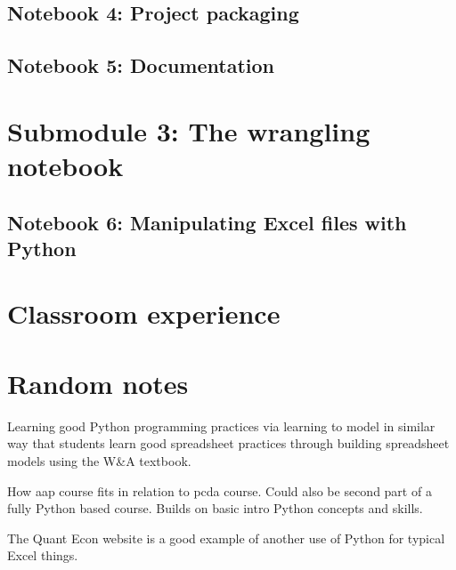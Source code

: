 \documentclass[ited,blindrev]{informs3}              %
\begin{document}
\subsection{Notebook 4: Project packaging}
\subsection{Notebook 5: Documentation}

\section{Submodule 3: The wrangling notebook}
\subsection{Notebook 6: Manipulating Excel files with Python}

\section{Classroom experience}

\section{Random notes}
Learning good Python programming practices via learning to model in similar way that students learn good spreadsheet practices through building spreadsheet models using the W\&A textbook.

How aap course fits in relation to pcda course. Could also be second part of a fully Python based course. Builds on basic intro Python concepts and skills.

The Quant Econ website is a good example of another use of Python for typical Excel things.

\ACKNOWLEDGMENT{%
}%


%
%
%
\end{document}
